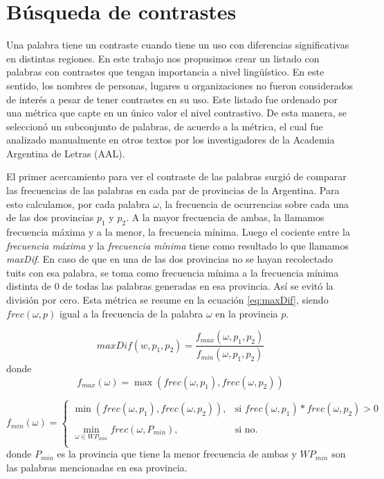 \section{Búsqueda de contrastes}

Una palabra tiene un contraste cuando tiene un uso con diferencias significativas en
distintas regiones. En este trabajo nos propusimos crear un listado con palabras con contrastes que tengan
importancia a nivel lingüístico. En este sentido, los nombres de personas, lugares u organizaciones no 
fueron considerados de interés a pesar de tener contrastes en su uso.
Este listado fue ordenado por una métrica que capte en un único valor el nivel contrastivo. De esta manera, 
se seleccionó un subconjunto de palabras, de acuerdo a la métrica, el cual fue analizado manualmente en otros textos por los investigadores de la Academia Argentina de Letras (AAL).

El primer acercamiento para ver el contraste de las palabras surgió de comparar las frecuencias de las palabras 
en cada par de provincias de la Argentina. Para esto calculamos, por cada palabra $\omega$, la frecuencia de ocurrencias sobre cada una de las dos provincias $p_1$ y $p_2$. A la mayor frecuencia de ambas, la llamamos frecuencia máxima y a la menor, la frecuencia mínima. Luego el cociente entre la \textit{frecuencia máxima} y la \textit{frecuencia mínima} tiene como resultado lo que llamamos \textit{maxDif}. En caso de que en una de las dos provincias no se hayan recolectado tuits con esa palabra, se toma como frecuencia mínima a la frecuencia mínima distinta de 0 de todas las palabras generadas en esa provincia. Así se evitó la división por cero. Esta métrica se resume en la ecuación \ref{eq:maxDif}, siendo $frec(\omega,p)$ igual a la frecuencia de la palabra $\omega$ en la provincia $p$.


\begin{equation}
  \label{eq:maxDif} 
  maxDif(w,p_1,p_2) = \frac{f_{max}(\omega,p_1,p_2)}{f_{min}(\omega,p_1,p_2)}
\end{equation}
donde 
\begin{equation}
f_{max}(\omega) = \max (frec(\omega,p_1),frec(\omega,p_2))
\end{equation}

\begin{equation}
 f_{min}(\omega) = \left\{ \begin{array}{lll}
             \min \left(frec\left(\omega,p_1\right),frec\left(\omega,p_2\right)\right), & \text{si } frec(\omega,p_1) * frec(\omega,p_2) > 0  & \\
             \\
             \min\limits_{\omega \in WP_{min}} frec\left(\omega,P_{min}\right) , &  \text{si no.} &  \\
             \end{array}
   \right.
\end{equation}
   donde $P_{min}$ es la provincia que tiene la menor frecuencia de ambas y $WP_{min}$ son las palabras mencionadas en esa provincia.



